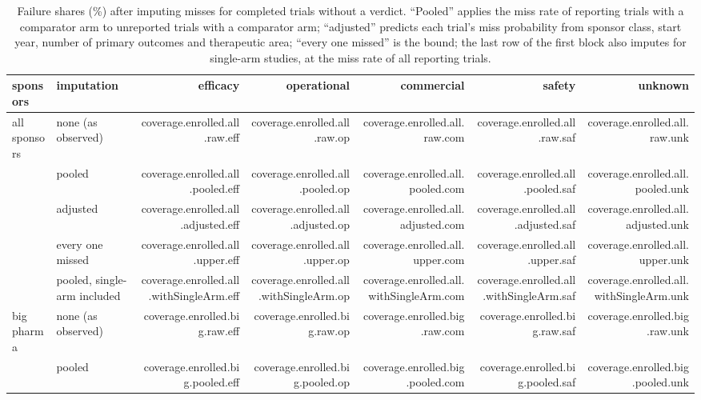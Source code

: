 \documentclass[11pt]{article}
\begin{document}
\begin{table}[H]
\centering
\caption{Failure shares (\%) after imputing misses for completed trials without a verdict. ``Pooled'' applies the miss rate of reporting trials with a comparator arm to unreported trials with a comparator arm; ``adjusted'' predicts each trial's miss probability from sponsor class, start year, number of primary outcomes and therapeutic area; ``every one missed'' is the bound; the last row of the first block also imputes for single-arm studies, at the miss rate of all reporting trials.}
\label{tab:coverage}
\footnotesize\setlength{\tabcolsep}{4pt}
\begin{tabular}{llrrrrr}
\toprule
sponsors & imputation & efficacy & operational & commercial & safety & unknown \\
\midrule
all sponsors & none (as observed) & \num{coverage.enrolled.all.raw.eff} & \num{coverage.enrolled.all.raw.op} & \num{coverage.enrolled.all.raw.com} & \num{coverage.enrolled.all.raw.saf} & \num{coverage.enrolled.all.raw.unk} \\
 & pooled & \num{coverage.enrolled.all.pooled.eff} & \num{coverage.enrolled.all.pooled.op} & \num{coverage.enrolled.all.pooled.com} & \num{coverage.enrolled.all.pooled.saf} & \num{coverage.enrolled.all.pooled.unk} \\
 & adjusted & \num{coverage.enrolled.all.adjusted.eff} & \num{coverage.enrolled.all.adjusted.op} & \num{coverage.enrolled.all.adjusted.com} & \num{coverage.enrolled.all.adjusted.saf} & \num{coverage.enrolled.all.adjusted.unk} \\
 & every one missed & \num{coverage.enrolled.all.upper.eff} & \num{coverage.enrolled.all.upper.op} & \num{coverage.enrolled.all.upper.com} & \num{coverage.enrolled.all.upper.saf} & \num{coverage.enrolled.all.upper.unk} \\
 & pooled, single-arm included & \num{coverage.enrolled.all.withSingleArm.eff} & \num{coverage.enrolled.all.withSingleArm.op} & \num{coverage.enrolled.all.withSingleArm.com} & \num{coverage.enrolled.all.withSingleArm.saf} & \num{coverage.enrolled.all.withSingleArm.unk} \\
\midrule
big pharma & none (as observed) & \num{coverage.enrolled.big.raw.eff} & \num{coverage.enrolled.big.raw.op} & \num{coverage.enrolled.big.raw.com} & \num{coverage.enrolled.big.raw.saf} & \num{coverage.enrolled.big.raw.unk} \\
 & pooled & \num{coverage.enrolled.big.pooled.eff} & \num{coverage.enrolled.big.pooled.op} & \num{coverage.enrolled.big.pooled.com} & \num{coverage.enrolled.big.pooled.saf} & \num{coverage.enrolled.big.pooled.unk} \\

\end{tabular}
\end{table}
\end{document}
